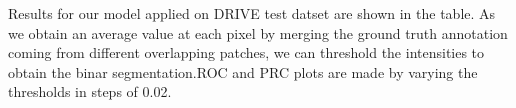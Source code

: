 Results for our model applied on DRIVE test datset are shown in the table. As we obtain an average value at each pixel by merging the ground truth annotation coming from different overlapping patches, we can threshold the intensities to obtain the binar segmentation.ROC and PRC plots are made by varying the thresholds in steps of 0.02.

